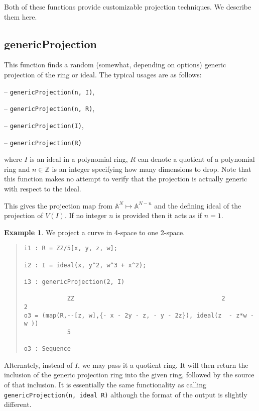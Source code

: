 \documentclass[11pt]{amsart}
\theoremstyle{definition}
\newtheorem{example}{Example}[section]
\begin{document}
Both of these functions provide customizable projection techniques. We describe them here. 


\subsection{genericProjection} 
This function finds a random (somewhat, depending on options) generic projection of the ring or ideal.
The typical usages are as follows: 
\vspace{0.5em}

-- {\tt genericProjection(n, I)},

-- {\tt genericProjection(n, R)},


-- {\tt genericProjection(I)},  

-- {\tt genericProjection(R)} 

\vspace{0.5em}
\noindent where 
$I$ is an ideal 
in a polynomial ring, 
$R$ can denote a quotient of a polynomial ring and 
$n\in \mathbb{Z}$ is
an integer specifying how many dimensions to drop.  Note that this function makes no attempt to verify that the projection is actually generic with respect to the ideal.


This gives the projection map from $\mathbb{A}^N \mapsto\mathbb{A}^{N-n}$ and the defining ideal of the projection of $V(I)$. If no integer $n$ is provided then it acts as if $n = 1$. 


\begin{example}	
    We project a curve in 4-space to one 2-space.
    ~~
  {{\small\color{blue}
  \begin{quote}
\begin{verbatim}
i1 : R = ZZ/5[x, y, z, w];

i2 : I = ideal(x, y^2, w^3 + x^2);

i3 : genericProjection(2, I)

            ZZ                                         2          2
o3 = (map(R,--[z, w],{- x - 2y - z, - y - 2z}), ideal(z  - z*w - w ))                   
            5

o3 : Sequence
\end{verbatim}
\end{quote}
    }}
\end{example}

Alternately, instead of {$I$}, we may pass it a quotient ring.  It will then return the inclusion of the generic projection ring into the given ring, followed by the source of that inclusion.  It is essentially the same functionality as calling {\tt genericProjection(n, ideal R)} although the format of the output is slightly different. 
\end{document}

